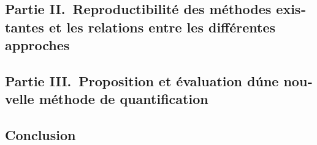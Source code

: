 \begin{otherlanguage}{french}
\subsection*{Partie II.~Reproductibilit\'e des m\'ethodes existantes et les relations entre les diff\'erentes approches}

\subsection*{Partie III.~Proposition et \'evaluation d\'une nouvelle m\'ethode de quantification}

\subsection*{Conclusion}


\end{otherlanguage}